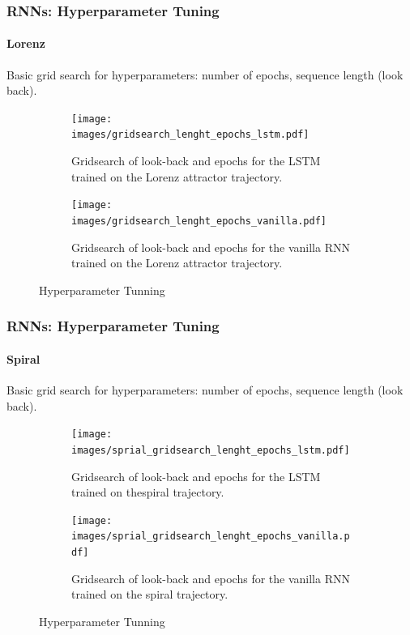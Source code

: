\documentclass{beamer}
\begin{document}
\begin{frame}[t]
	\frametitle{RNNs: Hyperparameter Tuning}
	\framesubtitle{Lorenz}
	Basic grid search for hyperparameters: number of epochs, sequence length (look back).
	\begin{figure}[htpb]
		\centering
		\begin{subfigure}[b]{0.45\textwidth}
		      \centering
		      \texttt{[image: images/gridsearch\_lenght\_epochs\_lstm.pdf]}
		      \caption{Gridsearch of look-back and epochs for the LSTM trained on the Lorenz attractor trajectory.}
		      \label{fig:hp-lstm}
	    \end{subfigure}
		    \hfill
	    \begin{subfigure}[b]{0.45\textwidth}
		      \centering
		      \texttt{[image: images/gridsearch\_lenght\_epochs\_vanilla.pdf]}
		      \caption{Gridsearch of look-back and epochs for the vanilla RNN trained on the Lorenz attractor trajectory.}
		      \label{fig:hp-vanilla}
	    \end{subfigure}
	    \caption{Hyperparameter Tunning}
		\label{fig:grid}
	\end{figure}
\end{frame}

\begin{frame}[t]
	\frametitle{RNNs: Hyperparameter Tuning}
	\framesubtitle{Spiral}
	Basic grid search for hyperparameters: number of epochs, sequence length (look back).
	\begin{figure}[htpb]
		\centering
		\begin{subfigure}[b]{0.45\textwidth}
		      \centering
		      \texttt{[image: images/sprial\_gridsearch\_lenght\_epochs\_lstm.pdf]}
		      \caption{Gridsearch of look-back and epochs for the LSTM trained on thespiral trajectory.}
		      \label{fig:hp-lstm-spiral}
	    \end{subfigure}
		    \hfill
	    \begin{subfigure}[b]{0.45\textwidth}
		      \centering
		      \texttt{[image: images/sprial\_gridsearch\_lenght\_epochs\_vanilla.pdf]}
		      \caption{Gridsearch of look-back and epochs for the vanilla RNN trained on the spiral trajectory.}
		      \label{fig:hp-vanilla-spiral}
	    \end{subfigure}
	    \caption{Hyperparameter Tunning}
		\label{fig:grid-spiral}
	\end{figure}
	
\end{frame}
\end{document}
